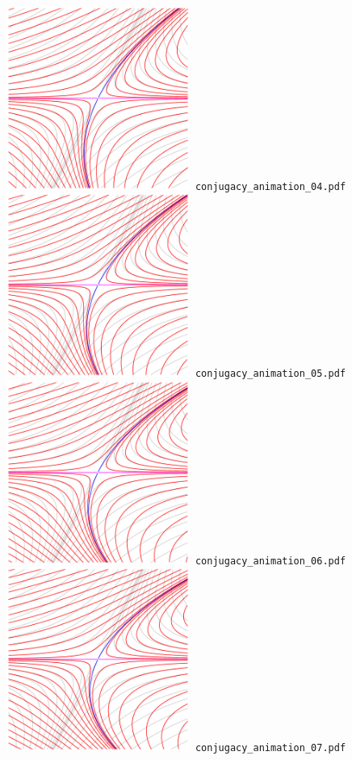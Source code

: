 \documentclass[a4paper]{amsart}
\begin{document}
\includegraphics[width=6cm]{conjugacy_animation_04.pdf}\verb+ conjugacy_animation_04.pdf+\\
\includegraphics[width=6cm]{conjugacy_animation_05.pdf}\verb+ conjugacy_animation_05.pdf+\\
\includegraphics[width=6cm]{conjugacy_animation_06.pdf}\verb+ conjugacy_animation_06.pdf+\\
\includegraphics[width=6cm]{conjugacy_animation_07.pdf}\verb+ conjugacy_animation_07.pdf+\\
\end{document}
